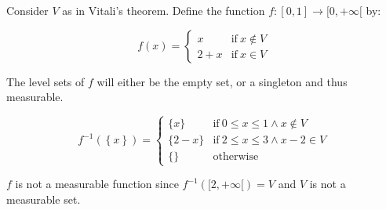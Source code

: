 \documentclass[12pt]{article}
\begin{document}
Consider $V$ as in Vitali's theorem. Define the function $f: [0,1] \to [0,+\infty[$ by:

\begin{displaymath}
f(x) = 
\begin{cases}
x & \text{if}\: x \notin V\\
2+x & \text{if}\: x \in V
\end{cases}
\end{displaymath}

The level sets of $f$ will either be the empty set, or a singleton  and thus measurable.

\begin{displaymath}
f^{-1} \left( \left\{ x \right\} \right) =
\begin{cases}
\{x\}   & \text{if}\: 0 \le x \le 1 \wedge x \notin V\\
\{2-x\} & \text{if}\: 2 \le x \le 3 \wedge x-2 \in V\\
\{\}    & \text{otherwise}
\end{cases}
\end{displaymath}

$f$ is not a measurable function since $f^{-1}([2,+\infty[) = V$ and $V$ is not a measurable set.
\end{document}
